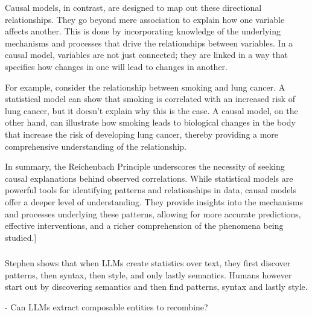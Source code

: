 Causal models, in contrast, are designed to map out these directional relationships. They go beyond mere association to explain how one variable affects another. This is done by incorporating knowledge of the underlying mechanisms and processes that drive the relationships between variables. In a causal model, variables are not just connected; they are linked in a way that specifies how changes in one will lead to changes in another.

For example, consider the relationship between smoking and lung cancer. A statistical model can show that smoking is correlated with an increased risk of lung cancer, but it doesn't explain why this is the case. A causal model, on the other hand, can illustrate how smoking leads to biological changes in the body that increase the risk of developing lung cancer, thereby providing a more comprehensive understanding of the relationship.

In summary, the Reichenbach Principle underscores the necessity of seeking causal explanations behind observed correlations. While statistical models are powerful tools for identifying patterns and relationships in data, causal models offer a deeper level of understanding. They provide insights into the mechanisms and processes underlying these patterns, allowing for more accurate predictions, effective interventions, and a richer comprehension of the phenomena being studied.]
\cite{causal_representation_learning}
\subsubsection{}
\subsubsection{}
\subsubsection{}

Stephen shows that when LLMs create statistics over text, they first discover patterns, then syntax, then style, and only lastly semantics. Humans however start out by discovering semantics and then find patterns, syntax and lastly style. 



- Can LLMs extract composable entities to recombine?

